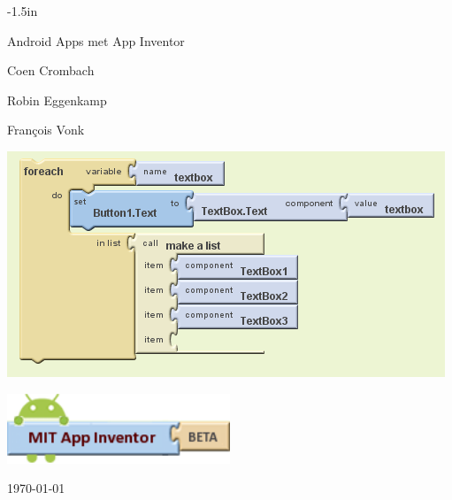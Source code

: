 \documentclass{BYUTextbook}
\begin{document}
\frontmatter

\thispagestyle{empty}
\begin{adjustwidth}{}{-1.5in}

 \centering
 \vspace{.8in}
 \Huge Android Apps met App Inventor
 \normalsize
 \vspace{.8in}

Coen Crombach

Robin Eggenkamp

Fran\c{c}ois Vonk

 \vspace{0.5in}

\includegraphics[width=\textwidth]{screenshots/building_blocks}

\vspace{0.25in}

\includegraphics[width=0.5\textwidth]{screenshots/AppInventorLogo}

 \vspace{.8in}

\today


\end{adjustwidth}

\cleardoublepage



\tableofcontents

\mainmatter







\cleardoublepage
\end{document}
